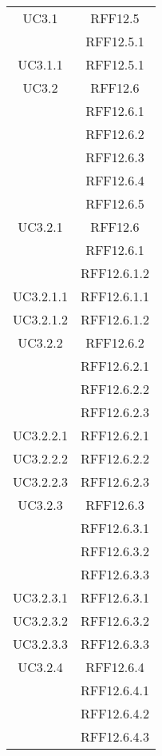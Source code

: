 \begin{longtable}{|c|c|}
\midrule
UC3.1
& RFF12.5\\
& RFF12.5.1\\


\midrule
UC3.1.1
& RFF12.5.1\\

\midrule
UC3.2
& RFF12.6\\
& RFF12.6.1\\
& RFF12.6.2\\
& RFF12.6.3\\
& RFF12.6.4\\
& RFF12.6.5\\

\midrule
UC3.2.1
& RFF12.6\\
& RFF12.6.1\\
& RFF12.6.1.2\\

\midrule
UC3.2.1.1
& RFF12.6.1.1\\

\midrule
UC3.2.1.2
& RFF12.6.1.2\\

\midrule
UC3.2.2
& RFF12.6.2\\
& RFF12.6.2.1\\
& RFF12.6.2.2\\
& RFF12.6.2.3\\

\midrule
UC3.2.2.1
& RFF12.6.2.1\\

\midrule
UC3.2.2.2
& RFF12.6.2.2\\

\midrule
UC3.2.2.3
& RFF12.6.2.3\\

\midrule
UC3.2.3
& RFF12.6.3\\
& RFF12.6.3.1\\
& RFF12.6.3.2\\
& RFF12.6.3.3\\

\midrule
UC3.2.3.1
& RFF12.6.3.1\\

\midrule
UC3.2.3.2
& RFF12.6.3.2\\

\midrule
UC3.2.3.3
& RFF12.6.3.3\\

\midrule
UC3.2.4
& RFF12.6.4\\
& RFF12.6.4.1\\
& RFF12.6.4.2\\
& RFF12.6.4.3\\


\end{longtable}
